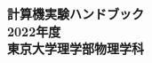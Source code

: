 \documentclass[a4j,dvipdfmx]{jsbook}
\newcommand{\hann}{2022年度}
\begin{document}
\thispagestyle{empty}
\pagestyle{empty}
\begin{titlepage}
    \vspace*{5cm}
    \begin{center}
        \textbf{\Huge 計算機実験ハンドブック}\\
        \vspace*{14cm}
        \textbf{\LARGE \hann}\\
        \vspace{1.0cm}
        \textbf{\LARGE 東京大学理学部物理学科}
    \end{center}
\end{titlepage}
\clearpage
\pagestyle{empty}
\cleardoublepage


\clearpage

\cleardoublepage

\setcounter{page}{1}
\setcounter{tocdepth}{3}
\tableofcontents

\clearpage
\pagestyle{plain}
\cleardoublepage






\end{document}
